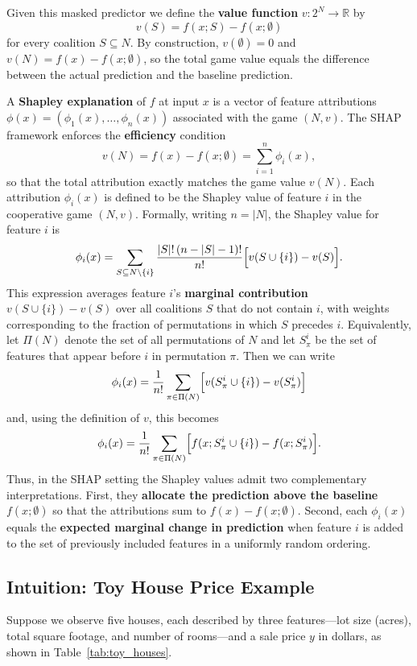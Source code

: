 \documentclass{article}
\begin{document}
Given this masked predictor we define the \textbf{value function} $v : 2^N \to \mathbb{R}$ by
\[
v(S) = f(x; S) - f(x; \emptyset)
\]
for every coalition $S \subseteq N$.
By construction, $v(\emptyset) = 0$ and $v(N) = f(x) - f(x; \emptyset)$, so the total game value equals the difference between the actual prediction and the baseline prediction.

A \textbf{Shapley explanation} of $f$ at input $x$ is a vector of feature attributions $\phi(x) = (\phi_1(x),\dots,\phi_n(x))$ associated with the game $(N,v)$.
The SHAP framework enforces the \textbf{efficiency} condition
\[
v(N) = f(x) - f(x; \emptyset) = \sum_{i=1}^n \phi_i(x),
\]
so that the total attribution exactly matches the game value $v(N)$.
Each attribution $\phi_i(x)$ is defined to be the Shapley value of feature $i$ in the cooperative game $(N,v)$.
Formally, writing $n = |N|$, the Shapley value for feature $i$ is
\[
\phi_i(x) = \sum_{S \subseteq N \setminus \{i\}} \frac{|S|! \, (n - |S| - 1)!}{n!} \Bigl[ v(S \cup \{i\}) - v(S) \Bigr].
\]
This expression averages feature $i$'s \textbf{marginal contribution} $v(S \cup \{i\}) - v(S)$ over all coalitions $S$ that do not contain $i$, with weights corresponding to the fraction of permutations in which $S$ precedes $i$.
Equivalently, let $\Pi(N)$ denote the set of all permutations of $N$ and let $S_\pi^i$ be the set of features that appear before $i$ in permutation $\pi$.
Then we can write
\[
\phi_i(x) = \frac{1}{n!} \sum_{\pi \in \Pi(N)} \Bigl[ v(S_\pi^i \cup \{i\}) - v(S_\pi^i) \Bigr]
\]
and, using the definition of $v$, this becomes
\[
\phi_i(x) = \frac{1}{n!} \sum_{\pi \in \Pi(N)} \Bigl[ f(x; S_\pi^i \cup \{i\}) - f(x; S_\pi^i) \Bigr].
\]
Thus, in the SHAP setting the Shapley values admit two complementary interpretations.
First, they \textbf{allocate the prediction above the baseline} $f(x; \emptyset)$ so that the attributions sum to $f(x) - f(x; \emptyset)$.
Second, each $\phi_i(x)$ equals the \textbf{expected marginal change in prediction} when feature $i$ is added to the set of previously included features in a uniformly random ordering.

\subsection{Intuition: Toy House Price Example}

Suppose we observe five houses, each described by three features—lot size (acres), total square footage, and number of rooms—and a sale price $y$ in dollars, as shown in Table~\ref{tab:toy_houses}.
\end{document}
